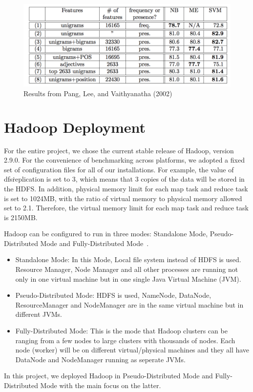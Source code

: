 \begin{figure}[!ht]
	\centering\includegraphics[width=\columnwidth]{images/pang-result.png}
        \caption{Results
	from Pang, Lee, and Vaithyanatha
	(2002)~\cite{hid-sp18-405-sentiment-pang2002thumbs}}\label{f:pang-result}
\end{figure}


\section{Hadoop Deployment}\label{s:hadoopdep}

For the entire project, we chose the current stable release of Hadoop, version 
2.9.0. For the convenience of benchmarking across platforms, we adopted a 
fixed set of configuration files for all of our installations. For example, the 
value of dfs\.replication is set to 3, which means that 3 copies of the data will 
be stored in the HDFS. In addition, physical memory limit for each map task 
and reduce task is set to 1024MB, with the ratio of virtual memory to physical 
memory allowed set to 2.1. Therefore, the virtual memory limit for each map 
task and reduce task is 2150MB. 

Hadoop can be configured to run in three modes: Standalone Mode, 
Pseudo-Distributed Mode and Fully-Distributed 
Mode~\cite{hid-sp18-405-hadoop-singlenode}. 
\begin{itemize}
	\item Standalone Mode: In this Mode, Local file system instead of HDFS is 
	used. Resource Manager, Node Manager and all other processes are 
	running not only in one virtual machine but in one single Java Virtual 
	Machine (JVM).
	\item Pseudo-Distributed Mode: HDFS is used, NameNode, DataNode, 
	ResourceManager and NodeManager are in the same virtual machine but in 
	different JVMs. 
	\item Fully-Distributed Mode: This is the mode that Hadoop clusters can be 
	ranging from a few nodes to large clusters with thousands of nodes. Each 
	node (worker) will be on different virtual/physical machines and they all 
	have DataNode and NodeManager running as seperate JVMs.
\end{itemize}
In this project, we deployed Hadoop in Pseudo-Distributed Mode and 
Fully-Distributed Mode with the main focus on the latter. 

